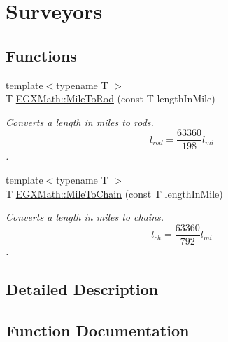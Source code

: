 \hypertarget{group___e_g_x_math-_conversions-_length_conversions-_imperial-_mile-_surveyors}{}\section{Surveyors}
\label{group___e_g_x_math-_conversions-_length_conversions-_imperial-_mile-_surveyors}
\subsection*{Functions}
\begin{DoxyCompactItemize}
\item 
{\footnotesize template$<$typename T $>$ }\\T \mbox{\hyperlink{group___e_g_x_math-_conversions-_length_conversions-_imperial-_mile-_surveyors_gae7e968004f761942f7d296ef66f1f93a}{E\+G\+X\+Math\+::\+Mile\+To\+Rod}} (const T length\+In\+Mile)
\begin{DoxyCompactList}\small\item\em Converts a length in miles to rods. \[ l_{rod}= \frac{63360}{198} l_{mi} \]. \end{DoxyCompactList}\item 
{\footnotesize template$<$typename T $>$ }\\T \mbox{\hyperlink{group___e_g_x_math-_conversions-_length_conversions-_imperial-_mile-_surveyors_gae3b09627ed639defe81e025bf827c8d7}{E\+G\+X\+Math\+::\+Mile\+To\+Chain}} (const T length\+In\+Mile)
\begin{DoxyCompactList}\small\item\em Converts a length in miles to chains. \[ l_{ch}= \frac{63360}{792} l_{mi} \]. \end{DoxyCompactList}\end{DoxyCompactItemize}


\subsection{Detailed Description}


\subsection{Function Documentation}
\mbox{\label{group___e_g_x_math-_conversions-_length_conversions-_imperial-_mile-_surveyors_gae3b09627ed639defe81e025bf827c8d7}} 

